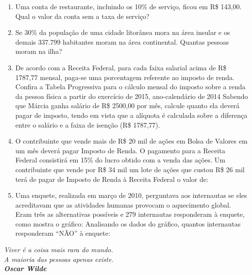\documentclass[twocolumn,oneside,a4paper,12pt]{article}
\begin{document}
\begin{enumerate}
\item Uma conta de restaurante, incluindo os 10\% de serviço, ficou em R\$ 143,00. Qual o valor da conta sem a taxa de serviço?

\item Se 30\% da população de uma cidade litorânea mora na área insular e os demais 337.799 habitantes moram na área continental. Quantas pessoas moram na ilha? 
 
\item De acordo com a Receita Federal, para cada faixa salarial acima de R\$ 1787,77 mensal, paga-se uma porcentagem referente ao imposto de renda. Confira a Tabela Progressiva para o cálculo mensal do imposto sobre a renda da pessoa física a partir do exercício de 2015, ano-calendário de 2014
Sabendo que Márcia ganha salário de R\$ 2500,00 por mês, calcule quanto ela deverá pagar de imposto, tendo em vista que a alíquota é calculada sobre a diferença entre o salário e a faixa de isenção (R\$ 1787,77).

\item O contribuinte que vende mais de R\$ 20 mil de ações em Bolsa de Valores em um mês deverá pagar Imposto de Renda. O pagamento para a Receita Federal consistirá em 15\% do lucro obtido com a venda das ações. Um contribuinte que vende por R\$ 34 mil um lote de ações que custou R\$ 26 mil terá de pagar de Imposto de Renda à Receita Federal o valor de:

\item Uma enquete, realizada em março de 2010, perguntava aos internautas se eles acreditavam que as atividades humanas provocam o aquecimento global. Eram três as alternativas possíveis e 279 internautas responderam à enquete, como mostra o gráfico:
Analisando os dados do gráfico, quantos internautas responderam ``NÃO'' à enquete:
\end{enumerate}

\begin{flushright}
\textit{Viver é a coisa mais rara do mundo.\\A maioria das pessoas apenas existe.\\\textbf{Oscar Wilde}}
\end{flushright}
\end{document}
